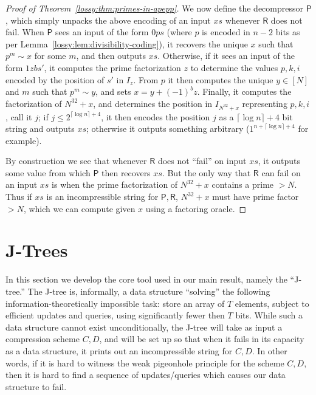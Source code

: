 \begin{proof}[Proof of Theorem~\ref{lossy:thm:primes-in-apepp}]
We now define the decompressor $\mathsf{P}$, which simply unpacks the above encoding of an input $xs$ whenever $\mathsf{R}$ does not fail. When $\mathsf{P}$ sees an input of the form $0ps$ (where $p$ is encoded in $n-2$ bits as per Lemma~\ref{lossy:lem:divisibility-coding}), it recovers the unique $x$ such that $p^m \sim x$ for some $m$, and then outputs $xs$. Otherwise, if it sees an input of the form $1zbs'$, it computes the prime factorization $z$ to determine the values $p,k,i$ encoded by the position of $s'$ in $I_z$. From $p$ it then computes the unique $y \in [N]$ and $m$ such that $p^m \sim y$, and sets $x = y + (-1)^b z$. Finally, it computes the factorization of $N^{32} + x$, and determines the position in $I_{N^{32} + x}$ representing $p,k,i$, call it $j$; if $j \leq 2^{\lceil \log n \rceil + 4}$, it then encodes the position $j$ as a $\lceil \log n \rceil + 4$ bit string and outputs $xs$; otherwise it outputs something arbitrary ($1^{n + \lceil \log n \rceil + 4}$ for example).

By construction we see that whenever $\mathsf{R}$ does not ``fail'' on input $xs$, it outputs some value from which $\mathsf{P}$ then recovers $xs$. But the only way that $\mathsf{R}$ can fail on an input $xs$ is when the prime factorization of $N^{32} + x$ contains a prime $> N$. Thus if $xs$ is an incompressible string for $\mathsf{P},\mathsf{R}$, $N^{32} +x$ must have prime factor $> N$, which we can compute given $x$ using a factoring oracle.
\end{proof}
\section{J-Trees}\label{lossy:sec:j-trees}
In this section we develop the core tool used in our main result, namely the ``J-tree.'' The J-tree is, informally, a data structure ``solving'' the following information-theoretically impossible task: store an array of $T$ elements, subject to efficient updates and queries, using significantly fewer then $T$ bits. While such a data structure cannot exist unconditionally, the J-tree will take as input a compression scheme $C,D$, and will be set up so that when it fails in its capacity as a data structure, it prints out an incompressible string for $C,D$. In other words, if it is hard to witness the weak pigeonhole principle for the scheme $C,D$, then it is hard to find a sequence of updates/queries which causes our data structure to fail.


